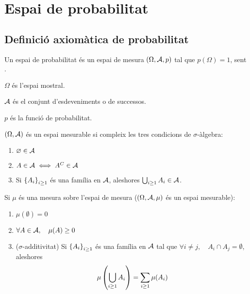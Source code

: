 \chapter{Espai de probabilitat}

\section{Definició axiomàtica de probabilitat}

\begin{defi}
    Un espai de probabilitat és un espai de mesura $(\Omega,\mathcal{A}, p)$ tal que $p(\Omega)=1$, sent .
\end{defi}

\begin{defi}
    $\Omega$ és l'espai mostral.
\end{defi}

\begin{defi}
    $\mathcal{A}$ és el conjunt d'esdeveniments o de successos.
\end{defi}

\begin{defi}
    $p$ és la funció de probabilitat.
\end{defi}

\begin{obs}
    $\left(\Omega,\mathcal{A}\right)$ és un espai mesurable si compleix les tres condicions de $\sigma$-àlgebra:
    \begin{enumerate}
        \item $\varnothing \in \mathcal{A}$
        \item $A \in \mathcal{A} \iff A^C \in \mathcal{A}$
        \item Si $\left\{ A_i\right\} _{i\ge1}$ és una família en $\mathcal{A}$, aleshores $\bigcup_{i\ge1}{A_i} \in \mathcal{A}$.
    \end{enumerate}
    Si $\mu$ és una mesura sobre l'espai de mesura ($\left(\Omega,\mathcal{A},\mu\right)$ és un espai mesurable):
    \begin{enumerate}
        \item $\mu(\emptyset) = 0$
        \item $\forall A \in \mathcal{A},\quad \mu(A) \ge0$
        \item ($\sigma$-additivitat) Si $\left\{ A_i\right\}_{i\ge 1}$ és una família en $\mathcal{A}$ tal que $\forall i \neq j,\quad A_i \cap A_j = \emptyset$,
        aleshores \[\mu\left(\bigcup_{i\ge 1}{A_i}\right) = \sum_{i\ge1}{\mu(A_i)}\]
    \end{enumerate}
\end{obs}

